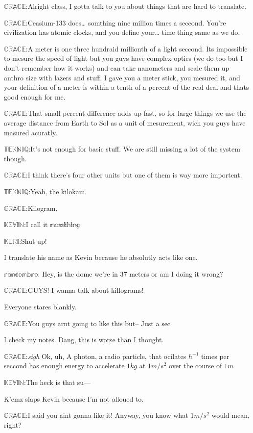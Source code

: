 \documentclass{article}
\newcommand{\gr}{\noindent$\mathbb{GRACE}$:}
\newcommand{\tek}{\noindent$\mathbb{TEKNIQ}$:}
\newcommand{\kev}{\noindent$\mathbb{KEVIN}$:}
\newcommand{\kem}{\noindent$\mathbb{KERI}$:}
\begin{document}
\gr Alright class, I gotta talk to you about things that are hard to translate.

\gr Ceasium-133 does\ldots{} somthing nine million times a seccond. You're civilization has atomic clocks, and you define your\ldots{} time thing same as we do.

\gr A meter is one three hundraid millionth of a light seccond. Its impossible to mesure the speed of light but you guys have complex optics (we do too but I don't remember how it works) and can take nanometers and scale them up anthro size with lazers and stuff. I gave you a meter stick, you mesured it, and your definition of a meter is within a tenth of a percent of the real deal and thats good enough for me.

\gr That small percent difference adds up fast, so for large things we use the average distance from Earth to Sol as a unit of mesurement, wich you guys have masured acuratly.

\tek It's not enough for basic stuff. We are still missing a lot of the system though.

\gr I think there's four other units but one of them is way more importent.

\tek Yeah, the kilokam.

\gr Kilogram.

\kev I call it $\mathbb{massthing}$ %

\kem Shut up!

I translate his name as Kevin because he absolutly acts like one.

\noindent$\mathbb{randombro}$: Hey, is the dome we're in 37 meters or am I doing it wrong?

\gr GUYS! I wanna talk about killograms!

Everyone stares blankly.

\gr You guys arnt going to like this but-- Just a sec

I check my notes. Dang, this is worse than I thought.

\gr \emph{sigh} Ok, uh, A photon, a radio particle, that ocilates $h^{-1}$ times per seccond has enough energy to accelerate $1kg$ at $1m/s^2$ over the course of $1m$

\kev The heck is that su---

K'emz slaps Kevin because I'm not alloued to.

\gr I said you aint gonna like it! Anyway, you know what $1m/s^2$ would mean, right?
\end{document}
